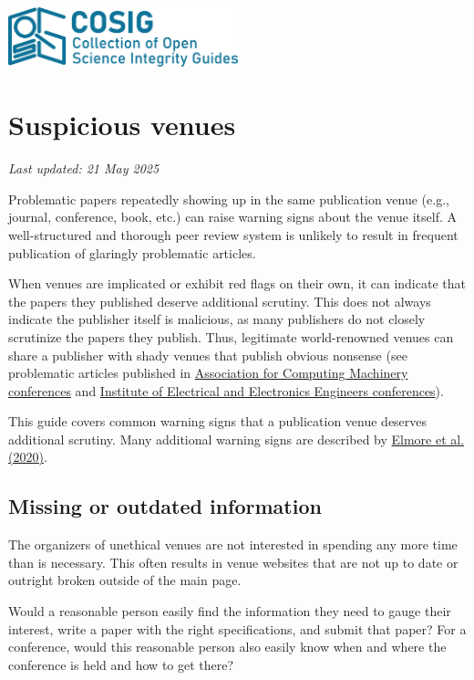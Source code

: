 \documentclass[letterpaper, 12pt]{article}
\begin{document}
\flushleft
\includegraphics[width=0.5\textwidth]{img/home/241017_final_logo_mockup.png}

\section*{Suspicious venues}
\textit{Last updated: 21 May 2025}

Problematic papers repeatedly showing up in the same publication venue (e.g., journal, conference, book, etc.) can raise warning signs about the venue itself. A well-structured and thorough peer review system is unlikely to result in frequent publication of glaringly problematic articles.

When venues are implicated or exhibit red flags on their own, it can indicate that the papers they published deserve additional scrutiny.
This does not always indicate the publisher itself is malicious, as many publishers do not closely scrutinize the papers they publish.
Thus, legitimate world-renowned venues can share a publisher with shady venues that publish obvious nonsense (see problematic articles published in \href{https://solalpirelli.github.io/2023/01/25/troubling-acm-venues.html}{Association for Computing Machinery conferences} and \href{https://deevybee.blogspot.com/2025/02/ieee-has-pseudoscience-problem.html}{Institute of Electrical and Electronics Engineers conferences}).

This guide covers common warning signs that a publication venue deserves additional scrutiny. Many additional warning signs are described by \href{https://doi.org/10.1177/0192623320920209}{Elmore et al. (2020)}.

\subsection*{Missing or outdated information}

The organizers of unethical venues are not interested in spending any more time than is necessary.
This often results in venue websites that are not up to date or outright broken outside of the main page.

Would a reasonable person easily find the information they need to gauge their interest,
write a paper with the right specifications, and submit that paper?
For a conference, would this reasonable person also easily know when and where the conference is held and how to get there?
\end{document}
